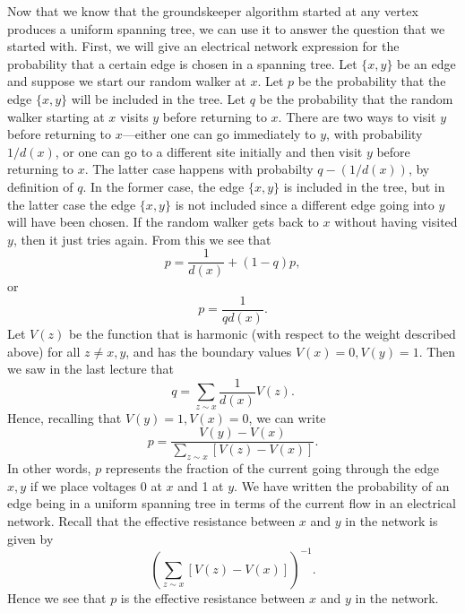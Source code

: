 \documentclass{stml-l}
\theoremstyle{definition}
\numberwithin{equation}{chapter}
\numberwithin{figure}{chapter}
\numberwithin{figure}{section}
\begin{document}
Now that we know that the groundskeeper algorithm started at any
vertex produces a uniform spanning tree, we can use it to answer the
question that we started with. First, we will give an electrical
network expression for the probability that a certain edge is chosen
in a spanning tree. Let $\{x,y\}$ be an edge and suppose we start
our random walker at $x$. Let $p$ be the probability that the edge
$\{x,y\}$ will be included in the tree. Let $q$ be the probability
that the random walker starting at $x$ visits $y$ before returning
to $x$. There are two ways to visit $y$ before returning to
$x$---either one can go immediately to $y$, with probability
$1/d(x)$, or one can go to a different site initially and then
visit $y$ before returning to $x$. The latter case happens with
probabilty $q-(1/d(x))$, by definition of $q$. In the former case,
the edge $\{x,y\}$ is included in the tree, but in the latter case
the edge $\{x,y\}$ is not included since a different edge going into
$y$ will have been chosen. If the random walker gets back to $x$
without having visited $y$, then it just tries again. From this we
see that
\begin{equation*}
p=\frac{1}{d(x)}+(1-q)p,
\end{equation*}
or
\begin{equation*}
p=\frac{1}{qd(x)}.
\end{equation*}
Let $V(z)$ be the function that is harmonic (with respect to the
weight described above) for all $z\neq x,y$, and has the boundary
values $V(x)= 0,V(y)=1$. Then we saw in the last lecture that
\begin{equation*}
q=\sum_{z\sim x}\frac{1}{d(x)}V(z).
\end{equation*}
Hence, recalling that $V(y)=1,V(x)=0$, we can write
\begin{equation*}
p=\frac{V(y)-V(x)}{\sum_{z\sim x}[V(z)-V(x)]}.
\end{equation*}
In other words, $p$ represents the fraction of the current going
through the edge $x,y$ if we place voltages $0$ at $x$ and 1 at $y$.
We have written the probability of an edge being in a uniform
spanning tree in terms of the current flow in an electrical network.
Recall that the effective resistance between $x$ and $y$ in the
network is given by
\begin{equation*}
\left(\sum_{z\sim x}[V(z)-V(x)]\right)^{-1}.
\end{equation*}
Hence we see that $p$ is the effective resistance between $x$ and $y$ in the network.
\end{document}
